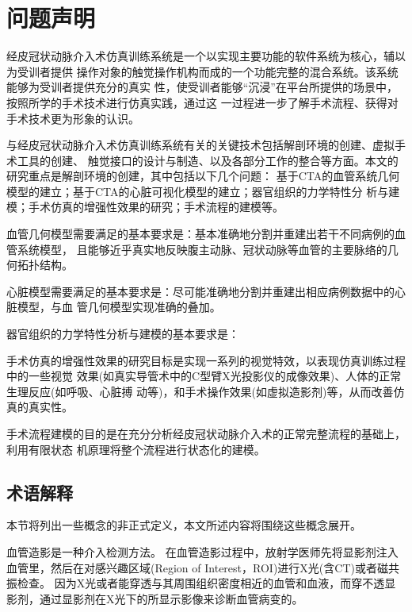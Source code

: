 \section{问题声明}
\label{sec1-1}


经皮冠状动脉介入术仿真训练系统是一个以实现主要功能的软件系统为核心，辅以为受训者提供
操作对象的触觉操作机构而成的一个功能完整的混合系统。该系统能够为受训者提供充分的真实
性，使受训者能够“沉浸”在平台所提供的场景中，按照所学的手术技术进行仿真实践，通过这
一过程进一步了解手术流程、获得对手术技术更为形象的认识。

与经皮冠状动脉介入术仿真训练系统有关的关键技术包括解剖环境的创建、虚拟手术工具的创建、
触觉接口的设计与制造、以及各部分工作的整合等方面。本文的研究重点是解剖环境的创建，其中包括以下几个问题：
基于CTA的血管系统几何模型的建立；基于CTA的心脏可视化模型的建立；器官组织的力学特性分
析与建模；手术仿真的增强性效果的研究；手术流程的建模等。

血管几何模型需要满足的基本要求是：基本准确地分割并重建出若干不同病例的血管系统模型，
且能够近乎真实地反映腹主动脉、冠状动脉等血管的主要脉络的几何拓扑结构。

心脏模型需要满足的基本要求是：尽可能准确地分割并重建出相应病例数据中的心脏模型，与血
管几何模型实现准确的叠加。

器官组织的力学特性分析与建模的基本要求是：

手术仿真的增强性效果的研究目标是实现一系列的视觉特效，以表现仿真训练过程中的一些视觉
效果(如真实导管术中的C型臂X光投影仪的成像效果)、人体的正常生理反应(如呼吸、心脏搏
动等)，和手术操作效果(如虚拟造影剂)等，从而改善仿真的真实性。

手术流程建模的目的是在充分分析经皮冠状动脉介入术的正常完整流程的基础上，利用有限状态
机原理将整个流程进行状态化的建模。

\subsection{术语解释}
\label{sec1-1-2}

本节将列出一些概念的非正式定义，本文所述内容将围绕这些概念展开。


\begin{definition}[血管造影]
血管造影是一种介入检测方法。
在血管造影过程中，放射学医师先将显影剂注入血管里，然后在对感兴趣区域(Region of Interest，ROI)进行X光(含CT)或者磁共振检查。
因为X光或者能穿透与其周围组织密度相近的血管和血液，而穿不透显影剂，通过显影剂在X光下的所显示影像来诊断血管病变的。
\end{definition}

